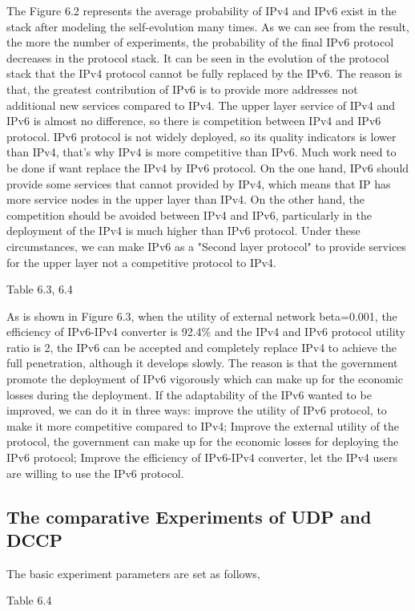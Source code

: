 \documentclass{article}
\begin{document}
The Figure 6.2 represents the average probability of IPv4 and IPv6 exist in the stack after modeling the self-evolution
many times. As we can see from the result, the more the number of experiments, the probability of the final IPv6 protocol
decreases in the protocol stack. It can be seen in the evolution of the protocol stack that the IPv4 protocol cannot be
fully replaced by the IPv6. The reason is that, the greatest contribution of IPv6 is to provide more addresses not
additional new services compared to IPv4. The upper layer service of IPv4 and IPv6 is almost no difference,  so there
is competition between IPv4 and IPv6 protocol. IPv6 protocol is not widely deployed, so its quality indicators is lower
than IPv4, that's why IPv4 is more competitive than IPv6. Much work need to be done if want replace the IPv4 by IPv6
protocol. On the one hand, IPv6 should provide some services that cannot provided by IPv4, which means that IP has more
service nodes in the upper layer than IPv4. On the other hand, the competition should be avoided between IPv4 and IPv6,
particularly in the deployment of the IPv4 is much higher than IPv6 protocol. Under these circumstances, we can make
IPv6 as a "Second layer protocol" to provide services for the upper layer not a competitive protocol to IPv4.

Table 6.3, 6.4

As is shown in Figure 6.3, when the utility of external network beta=0.001, the efficiency of IPv6-IPv4 converter is 92.4\%
and the IPv4 and IPv6 protocol utility ratio is 2, the IPv6 can be accepted and completely replace IPv4 to achieve the full
penetration, although it develops slowly.   The reason is that the government promote the deployment of IPv6 vigorously which
can make up for the economic losses during the deployment. If the adaptability of the IPv6 wanted to be improved, we can do
it in three ways: improve the utility of IPv6 protocol, to make it more competitive compared to IPv4; Improve the external
utility of the protocol, the government can make up for the economic losses for deploying the IPv6 protocol; Improve the
efficiency of IPv6-IPv4 converter, let the IPv4 users are willing to use the IPv6 protocol.

\subsection{The comparative Experiments of UDP and DCCP}
The basic experiment parameters are set as follows,

Table 6.4
\end{document}
